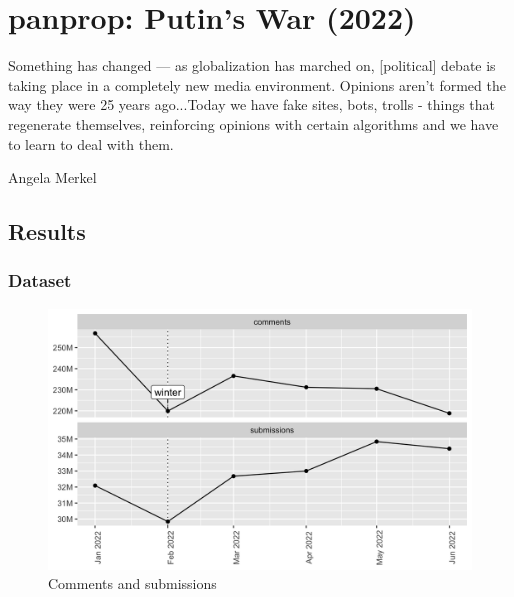 \documentclass[doublespacing]{utdthesis}
\begin{document}
\chapter{panprop: Putin's War (2022)}
\epigraph{Something has changed — as globalization has marched on, [political] debate is taking place in a completely new media environment. Opinions aren't formed the way they were 25 years ago...Today we have fake sites, bots, trolls - things that regenerate themselves, reinforcing opinions with certain algorithms and we have to learn to deal with them.}{Angela Merkel}


\section{Results}

\subsection{Dataset}

\begin{figure}[!ht]
\centering
\includegraphics[width=\textwidth]{2022/count}
\caption{Comments and submissions}
\label{fig:count_2022}
\end{figure}
\end{document}
